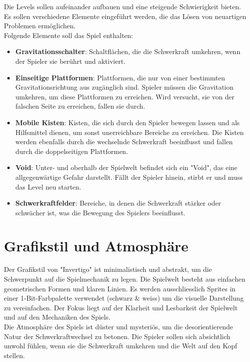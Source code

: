 \documentclass{article}
\begin{document}
Die Levels sollen aufeinander aufbauen und eine steigende Schwierigkeit bieten.
Es sollen verschiedene Elemente eingeführt werden, die das Lösen von neuartigen Problemen ermöglichen.
\\
Folgende Elemente soll das Spiel enthalten:
\begin{itemize}
    \item \textbf{Gravitationsschalter}: Schaltflächen, die die Schwerkraft umkehren, wenn der Spieler sie berührt und aktiviert.
    \item \textbf{Einseitige Plattformen}: Plattformen, die nur von einer bestimmten Gravitationsrichtung aus zugänglich sind.
    Spieler müssen die Gravitation umkehren, um diese Plattformen zu erreichen. Wird versucht, sie von der falschen Seite zu erreichen, fallen sie durch.
    \item \textbf{Mobile Kisten}: Kisten, die sich durch den Spieler bewegen lassen und als Hilfsmittel dienen, um sonst unerreichbare Bereiche zu erreichen.
    Die Kisten werden ebenfalls durch die wechselnde Schwerkraft beeinflusst und fallen durch die doppelseitigen Plattformen.
    \item \textbf{Void}: Unter- und oberhalb der Spielwelt befindet sich ein "Void", das eine allgegenwärtige Gefahr darstellt. Fällt der Spieler hinein, stirbt er und muss das Level neu starten.
    \item \textbf{Schwerkraftfelder}: Bereiche, in denen die Schwerkraft stärker oder schwächer ist, was die Bewegung des Spielers beeinflusst.
\end{itemize}

\section{Grafikstil und Atmosphäre}

Der Grafikstil von "Invertigo" ist minimalistisch und abstrakt, um die Schwerpunkt auf die Spielmechanik zu legen. Die Spielwelt besteht aus einfachen geometrischen Formen und klaren Linien.
Es werden ausschliesslich Sprites in einer 1-Bit-Farbpalette verwendet (schwarz \& weiss) um die visuelle Darstellung zu vereinfachen.
Der Fokus liegt auf der Klarheit und Lesbarkeit der Spielwelt und auf den Mechaniken des Spiels.
\\
Die Atmosphäre des Spiels ist düster und mysteriös, um die desorientierende Natur der Schwerkraftwechsel zu betonen.
Die Spieler sollen sich absichtlich unwohl fühlen, wenn sie die Schwerkraft umkehren und die Welt auf den Kopf stellen.
\end{document}
